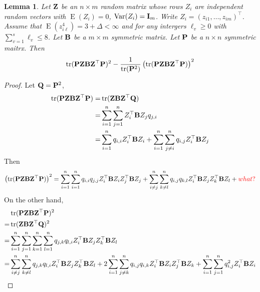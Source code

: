 \documentclass[11pt]{article}
\newcommand\CG[1]{\textcolor{red}{#1}}
\DeclareMathOperator{\mytr}{tr}
\DeclareMathOperator{\myE}{E}
\DeclareMathOperator{\myVar}{Var}
\theoremstyle{plain}
\newtheorem{lemma}{\quad\quad Lemma}
\theoremstyle{definition}
\theoremstyle{remark}
\begin{document}
\begin{lemma}
    Let $\mathbf{Z}$ be an $n\times m$ random matrix whose rows $Z_i$ are independent random vectors with $\myE (Z_i)=0$, $\myVar (Z_i)= \BI_m$.
    Write $Z_i=(z_{i1},\ldots,z_{im})^\top$.
    Assume that $\myE (z_{i\ell}^4)=3 + \Delta <\infty$ and for any intergers $\ell_v \geq 0$ with $\sum_{v=1}^s \ell_v \leq 8$.
    Let $\mathbf{B}$ be a $m\times m$ symmetric matrix.
    Let $\mathbf{P}$ be a $n\times n$ symmetric maitrx.
    Then
    \begin{equation*}
    \mytr(\BP \BZ \BB \BZ^\top \BP)^2 - \frac{1}{\mytr(\BP^2)}\left( \mytr(\BP \BZ \BB \BZ^\top \BP)\right)^2
    \end{equation*}
\end{lemma}
\begin{proof}
    Let $\mathbf{Q}=\mathbf{P}^2$,
\begin{equation*}
    \begin{split}
    \mytr(\BP \BZ \BB \BZ^\top \BP)
    =&
    \mytr( \BZ \BB \BZ^\top \BQ)\\
    =&\sum_{i=1}^n \sum_{j=1}^n  Z_{i}^\top \BB Z_{j} q_{j,i}
    \\
    =&
    \sum_{i=1}^n q_{i,i} Z_{i}^\top \BB Z_{i} 
    +
    \sum_{i=1}^n \sum_{j\neq i}^n q_{i,j} Z_{i}^\top \BB Z_{j}
    \end{split}
\end{equation*}
Then
\begin{equation*}
    \left(\mytr(\BP \BZ \BB \BZ^\top \BP)\right)^2
    =
    \sum_{i=1}^n
    \sum_{i=1}^n
    q_{i,i} q_{j,j} Z_{i}^\top \BB Z_{i} 
     Z_{j}^\top \BB Z_{j} 
    +
     \sum_{i\neq j}^n
     \sum_{k\neq l}^n
     q_{i,j}
     q_{k,l}
     Z_{i}^\top \BB Z_{j}
      Z_{k}^\top \BB Z_{l}
      +\CG{what?}
\end{equation*}
On the other hand,
\begin{equation*}
    \begin{split}
    &\mytr(\BP \BZ \BB \BZ^\top \BP)^2
    \\
    =&
    \mytr(\BZ \BB \BZ^\top \BQ )^2
    \\
    =&
    \sum_{i=1}^n\sum_{j=1}^n \sum_{k=1}^n \sum_{l=1}^n q_{j,k} q_{l,i} Z_{i}^\top \BB Z_{j} 
      Z_{k}^\top \BB Z_{l} 
      \\
    =&
    \sum_{i\neq j}^n \sum_{k\neq l}^n  q_{j,k} q_{l,i} Z_{i}^\top \BB Z_{j} 
      Z_{k}^\top \BB Z_{l} 
      +
    2\sum_{i=1}^n \sum_{j\neq k}^n  q_{i,j} q_{i,k} Z_{i}^\top \BB Z_{i} 
      Z_{j}^\top \BB Z_{k} 
      +
    \sum_{i=1}^n \sum_{j=1}^n  q_{i,j}^2 Z_{i}^\top \BB Z_{i} 

\end{split}
\end{equation*}
\end{proof}
\end{document}
